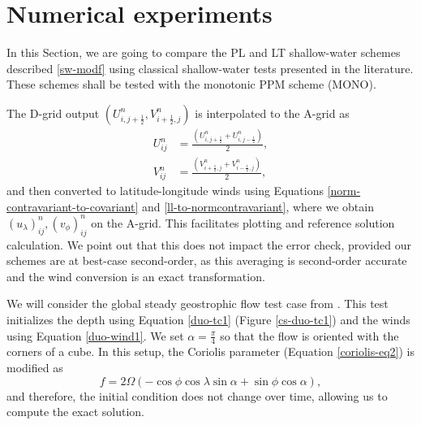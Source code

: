 \section{Numerical experiments}
\label{sec:numerical_results}
In this Section, we are going to compare the PL and LT shallow-water schemes described \eqref{sw-modf} using classical
shallow-water tests presented in the literature.
These schemes shall be tested with the monotonic PPM scheme (MONO).

The D-grid output $(U_{i,j+\frac{1}{2}}^n,V_{i+\frac{1}{2},j}^n)$ is interpolated to the A-grid as
\begin{align}
U_{ij}^n &= \frac{(U_{i,j+\frac{1}{2}}^n+U_{i,j-\frac{1}{2}}^n)}{2},\\
V_{ij}^n &= \frac{(V_{i+\frac{1}{2},j}^n+V_{i-\frac{1}{2},j}^n)}{2},
\end{align}
and then converted to latitude-longitude winds using Equations \eqref{norm-contravariant-to-covariant} and \eqref{ll-to-normcontravariant},
where we obtain $(u_{\lambda})_{ij}^n,(v_{\phi})_{ij}^n$ on the A-grid.
This facilitates plotting and reference solution calculation. 
We point out that this does not impact the error check, 
provided our schemes are at best-case second-order, 
as this averaging is second-order accurate and the wind conversion is an exact transformation.


We will consider the global steady geostrophic flow test case from \citet{will:1992}.
This test initializes the depth using Equation \eqref{duo-tc1} (Figure \ref{cs-duo-tc1}) and the winds using Equation \eqref{duo-wind1}.
We set $\alpha=\frac{\pi}{4}$ so that the flow is oriented with the corners of a cube.
In this setup, the Coriolis parameter (Equation \eqref{coriolis-eq2}) is modified as
\begin{equation}
	\label{coriolis-eq2}
	f = 2 \Omega(-\cos{\phi}\cos{\lambda}\sin{\alpha} + \sin{\phi}\cos{\alpha}),
\end{equation}
and therefore, the initial condition does not change over time, allowing us to compute the exact solution.

